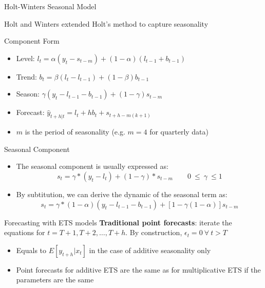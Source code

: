 \documentclass{beamer}
\begin{document}
\begin{frame}{Holt-Winters Seasonal Model}

  Holt and Winters extended Holt's method to capture seasonality
  
  \begin{block}{Component Form}
    \begin{itemize}
    \item Level: $l_t = \alpha (y_t - s_{t-m}) + (1- \alpha )(l_{t-1} + b_{t-1})$
    \item Trend: $b_t = \beta(l_t - l_{t-1}) + (1-\beta)b_{t-1}$
    \item Season: $\gamma(y_t - l_{t-1} - b_{t-1}) + (1-\gamma)s_{t-m}$
    \item Forecast: $\hat{y}_{t+h|t} = l_t + hb_t + s_{t+h - m(k+1)}$
    \end{itemize}
  \end{block}

  \begin{itemize}
  \item $m$ is the period of seasonality (e.g. $m = 4$ for quarterly data)
  \end{itemize}
  
\end{frame}


\begin{frame}{Seasonal Component}
  \begin{itemize}
  \item The seasonal component is usually expressed as:
    \begin{equation*}
      s_t = \gamma*(y_t - l_t) + (1-\gamma)*s_{t-m} \qquad 0 \ \leq \ \gamma \ \leq 1
    \end{equation*}
  \item By subtitution, we can derive the dynamic of the seasonal term as:
    \begin{equation*}
      s_t = \gamma*(1-\alpha)(y_t - l_{t-1} - b_{t-1}) + [1 - \gamma(1-\alpha)] s_{t-m}
    \end{equation*}
  \end{itemize}  
\end{frame}




\begin{frame}{Forecasting with ETS models}
\textbf{Traditional point forecasts}: iterate the equations for $t = T+1, T+2, \dots, T+h$. By construction, $\epsilon_t = 0 \ \forall \ t>T$

\begin{itemize}
\item Equals to $E[y_{t+h}|x_t]$ in the case of additive seasonality only
\item Point forecasts for additive ETS are the same as for multiplicative ETS if the parameters are the same
\end{itemize}
  
\end{frame}
\end{document}
